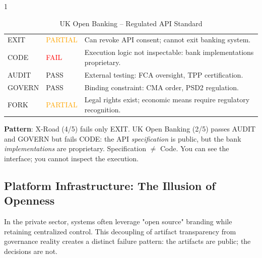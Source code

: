 \documentclass{article}
\begin{document}
\begin{table}[htbp]
    \begin{subtable}{1\textwidth}
        \centering
        \caption{UK Open Banking -- Regulated API Standard}
        \small
        \begin{tabular}{@{}llp{8.5cm}@{}}
            \toprule
            EXIT & \textcolor{orange}{PARTIAL} & Can revoke API consent; cannot exit banking system. \\
            CODE & \textcolor{red}{FAIL} & Execution logic not inspectable: bank implementations proprietary. \\
            AUDIT & \textcolor{green!50!black}{PASS} & External testing: FCA oversight, TPP certification. \\
            GOVERN & \textcolor{green!50!black}{PASS} & Binding constraint: CMA order, PSD2 regulation. \\
            FORK & \textcolor{orange}{PARTIAL} & Legal rights exist; economic means require regulatory recognition. \\
            \bottomrule
        \end{tabular}
    \end{subtable}
\end{table}

\textbf{Pattern}: X-Road (4/5) fails only EXIT. UK Open Banking (2/5) passes AUDIT and GOVERN but fails CODE: the API \textit{specification} is public, but the bank \textit{implementations} are proprietary. Specification $\neq$ Code. You can see the interface; you cannot inspect the execution.

\subsection{Platform Infrastructure: The Illusion of Openness}

In the private sector, systems often leverage "open source" branding while retaining centralized control. This decoupling of artifact transparency from governance reality creates a distinct failure pattern: the artifacts are public; the decisions are not.
\end{document}
